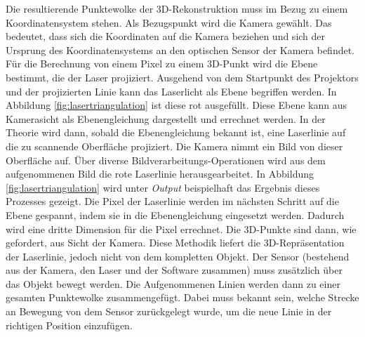 	Die resultierende Punktewolke der 3D-Rekonstruktion muss im Bezug zu einem Koordinatensystem stehen. Als Bezugspunkt wird die Kamera gewählt. Das bedeutet, dass sich die Koordinaten auf die Kamera beziehen und sich der Ursprung des Koordinatensystems an den optischen Sensor der Kamera befindet. Für die Berechnung von einem Pixel zu einem 3D-Punkt wird die Ebene bestimmt, die der Laser projiziert. Ausgehend von dem Startpunkt des Projektors und der projizierten Linie kann das Laserlicht als Ebene begriffen werden. In Abbildung \ref{fig:lasertriangulation} ist diese rot ausgefüllt. Diese Ebene kann aus Kamerasicht als Ebenengleichung dargestellt und errechnet werden. In der Theorie wird dann, sobald die Ebenengleichung bekannt ist, eine Laserlinie auf die zu scannende Oberfläche projiziert. Die Kamera nimmt ein Bild von dieser Oberfläche auf. Über diverse Bildverarbeitungs-Operationen wird aus dem aufgenommenen Bild die rote Laserlinie herausgearbeitet. In Abbildung \ref{fig:lasertriangulation} wird unter \emph{Output} beispielhaft das Ergebnis dieses Prozesses gezeigt. Die Pixel der Laserlinie werden im nächsten Schritt auf die Ebene gespannt, indem sie in die Ebenengleichung eingesetzt werden. Dadurch wird eine dritte Dimension für die Pixel errechnet. Die 3D-Punkte sind dann, wie gefordert, aus Sicht der Kamera. Diese Methodik liefert die 3D-Repräsentation der Laserlinie, jedoch nicht von dem kompletten Objekt. Der Sensor (bestehend aus der Kamera, den Laser und der Software zusammen) muss zusätzlich über das Objekt bewegt werden. Die Aufgenommenen Linien werden dann zu einer gesamten Punktewolke zusammengefügt. Dabei muss bekannt sein, welche Strecke an Bewegung von dem Sensor zurückgelegt wurde, um die neue Linie in der richtigen Position einzufügen. 
